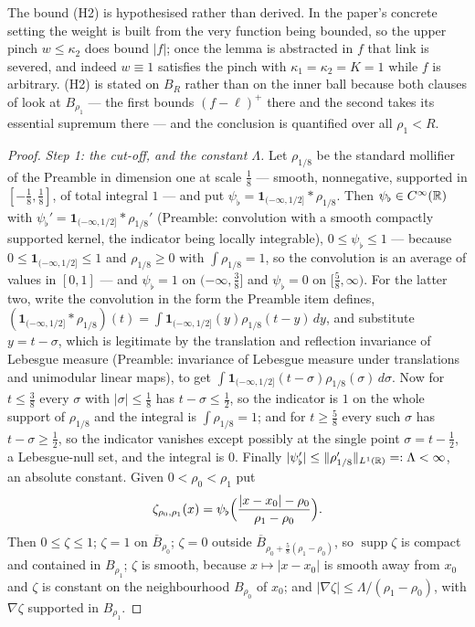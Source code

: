 \begin{lemma}
The bound (H2) is hypothesised rather than derived.  In the paper's concrete
setting the weight is built from the very function being bounded, so the upper
pinch $w\le\kappa_2$ does bound $|f|$; once the lemma is abstracted in $f$ that
link is severed, and indeed $w\equiv1$ satisfies the pinch with
$\kappa_1=\kappa_2=K=1$ while $f$ is arbitrary.  (H2) is stated on $B_R$ rather
than on the inner ball because both clauses of
 look at $B_{\rho_1}$ --- the first bounds
$(f-\ell)^+$ there and the second takes its essential supremum there --- and the
conclusion is quantified over all $\rho_1<R$.
\end{lemma}
\begin{proof}
\emph{Step 1: the cut-off, and the constant $\Lambda$.}  Let $\rho_{1/8}$ be the
standard mollifier of the Preamble in dimension one at scale $\tfrac18$ ---
smooth, nonnegative, supported in $[-\tfrac18,\tfrac18]$, of total integral $1$
--- and put $\psi_\flat=\mathbf1_{(-\infty,1/2]}*\rho_{1/8}$.  Then
$\psi_\flat\in C^\infty(\mathbb{R})$ with
$\psi_\flat'=\mathbf1_{(-\infty,1/2]}*\rho_{1/8}'$ (Preamble: convolution with a
smooth compactly supported kernel, the indicator being locally integrable),
$0\le\psi_\flat\le1$ --- because $0\le\mathbf1_{(-\infty,1/2]}\le1$ and
$\rho_{1/8}\ge0$ with $\int\rho_{1/8}=1$, so the convolution is an average of
values in $[0,1]$ --- and $\psi_\flat=1$ on $(-\infty,\tfrac38]$ and
$\psi_\flat=0$ on $[\tfrac58,\infty)$.  For the latter two, write the
convolution in the form the Preamble item defines,
$(\mathbf1_{(-\infty,1/2]}*\rho_{1/8})(t)
=\int\mathbf1_{(-\infty,1/2]}(y)\rho_{1/8}(t-y)\,dy$, and substitute
$y=t-\sigma$, which is legitimate by the translation and reflection invariance
of Lebesgue measure (Preamble: invariance of Lebesgue measure under
translations and unimodular linear maps), to get
$\int\mathbf1_{(-\infty,1/2]}(t-\sigma)\rho_{1/8}(\sigma)\,d\sigma$.  Now for
$t\le\tfrac38$ every $\sigma$ with $|\sigma|\le\tfrac18$ has
$t-\sigma\le\tfrac12$, so the indicator is $1$ on the whole support of
$\rho_{1/8}$ and the integral is $\int\rho_{1/8}=1$; and for $t\ge\tfrac58$
every such $\sigma$ has $t-\sigma\ge\tfrac12$, so the indicator vanishes except
possibly at the single point $\sigma=t-\tfrac12$, a Lebesgue-null set, and the
integral is $0$.  Finally
$|\psi_\flat'|\le\|\rho_{1/8}'\|_{L^1(\mathbb{R})}=:\Lambda<\infty$, an absolute
constant.  Given $0<\rho_0<\rho_1$ put
\[
\zeta_{\rho_0,\rho_1}(x)=\psi_\flat\Bigl(\frac{|x-x_0|-\rho_0}{\rho_1-\rho_0}\Bigr).
\]
Then $0\le\zeta\le1$; $\zeta=1$ on $\overline B_{\rho_0}$; $\zeta=0$ outside
$\overline B_{\rho_0+\frac58(\rho_1-\rho_0)}$, so $\operatorname{supp}\zeta$ is
compact and contained in $B_{\rho_1}$; $\zeta$ is smooth, because
$x\mapsto|x-x_0|$ is smooth away from $x_0$ and $\zeta$ is constant on the
neighbourhood $B_{\rho_0}$ of $x_0$; and
$|\nabla\zeta|\le\Lambda/(\rho_1-\rho_0)$, with $\nabla\zeta$ supported in
$B_{\rho_1}$.


\end{proof}
